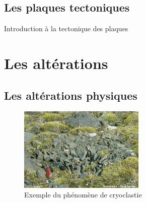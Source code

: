 \documentclass{beamer}
\begin{document}
\subsection{Les plaques tectoniques}
\begin{frame}{Introduction à la tectonique des plaques}
  \begin{center}
    \begin{figure}
    \end{figure}
    \begin{figure}
    \end{figure}
  \end{center}
\end{frame}

\section{Les altérations}
\subsection{Les altérations physiques}
\begin{frame}
  \begin{center}
    \begin{figure}
      \includegraphics[width=6cm]{Images/Diapos/Alteration/Physique/cryoclastie.jpg}
      \caption{Exemple du phénomène de cryoclastie}
    \end{figure}
  \end{center}
\end{frame}
\end{document}
